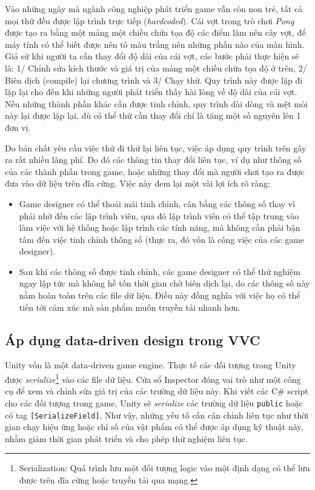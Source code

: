 \documentclass[12pt]{report}
\newcommand{\project}{VVC }
\begin{document}
Vào những ngày mà ngành công nghiệp phát triển game vẫn còn non trẻ, tất cả mọi thứ đều được lập trình trực tiếp (\textit{hardcoded}). Cái vợt trong trò chơi \textit{Pong} được tạo ra bằng một mảng một chiều chứa tọa độ các điểm làm nên cây vợt, để máy tính có thể biết được nên tô màu trắng nên những phần nào của màn hình. Giả sử khi người ta cần thay đổi độ dài của cái vợt, các bước phải thực hiện sẽ là: 1/ Chỉnh sửa kích thước và giá trị của mảng một chiều chứa tọa độ ở trên, 2/ Biên dịch (compile) lại chương trình và 3/ Chạy thử. Quy trình này được lặp đi lặp lại cho đến khi những người phát triển thấy hài lòng về độ dài của cái vợt. Nếu những thành phần khác cần được tinh chỉnh, quy trình dài dòng và mệt mỏi này lại được lặp lại, dù có thể thứ cần thay đổi chỉ là tăng một số nguyên lên 1 đơn vị.

Do bản chất yêu cầu việc thử đi thử lại liên tục, việc áp dụng quy trình trên gây ra rất nhiều lãng phí. Do đó các thông tin thay đổi liên tục, ví dụ như thông số của các thành phần trong game, hoặc những thay đổi mà người chơi tạo ra được đưa vào dữ liệu trên đĩa cứng. Việc này đem lại một vài lợi ích rõ ràng:
\begin{itemize}
	\item Game designer có thể thoải mái tinh chỉnh, cân bằng các thông số thay vì phải nhờ đến các lập trình viên, qua đó lập trình viên có thể tập trung vào làm việc với hệ thống hoặc lập trình các tính năng, mà không cần phải bận tâm đến việc tinh chỉnh thông số (thực ra, đó vốn là công việc của các game designer).
	\item Sau khi các thông số được tinh chỉnh, các game designer có thể thử nghiệm ngay lập tức mà không hề tốn thời gian chờ biên dịch lại, do các thông số này nằm hoàn toàn trên các file dữ liệu. Điều này đồng nghĩa với việc họ có thể tiến tới cảm xúc mà sản phẩm muốn truyền tải nhanh hơn.
\end{itemize}
\subsection{Áp dụng data-driven design trong \project}
Unity vốn là một data-driven game engine. Thực tế các đối tượng trong Unity được \textit{serialize}\footnote{Serialization: Quá trình lưu một đối tượng logic vào một định dạng có thể lưu được trên đĩa cứng hoặc truyền tải qua mạng.} vào các file dữ liệu. Cửa sổ Inspector đóng vai trò như một công cụ để xem và chỉnh sửa giá trị của các trường dữ liệu này. Khi viết các C\# script cho các đối tượng trong game, Unity sẽ \textit{serialize} các trường dữ liệu \texttt{public} hoặc có tag \texttt{[SerializeField]}. Như vậy, những yếu tố cần cân chỉnh liên tục như thời gian chạy hiệu ứng hoặc chỉ số của vật phẩm có thể được áp dụng kỹ thuật này, nhằm giảm thời gian phát triển và cho phép thử nghiệm liên tục.
\end{document}
